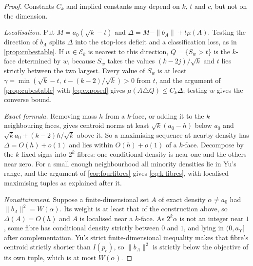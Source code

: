 \documentclass[11pt,a4paper]{article}
\numberwithin{equation}{section}
\theoremstyle{remark}
\begin{document}
\begin{proof}
Constants $C_k$ and implied constants may depend on $k$, $t$ and $c$, but
not on the dimension.

\emph{Localisation.} Put $M=a_0(\sqrt k-t)$ and
$\Delta=M-\|b_A\|+t\mu(A)$. Testing the direction of $b_A$ splits $\Delta$
into the stop-loss deficit and a classification loss, as in
\cref{prop:cubestable}. If $w\in\mathcal E_k$ is nearest to this direction,
$Q=\{S_w>t\}$ is the $k$-face determined by $w$, because $S_w$ takes the
values $(k-2j)/\sqrt k$ and $t$ lies strictly between the two largest. Every
value of $S_w$ is at least
$\gamma=\min(\sqrt k-t,\ t-(k-2)/\sqrt k)>0$ from $t$, and the argument of
\cref{prop:cubestable} with \eqref{eq:exposed} gives
$\mu(A\triangle Q)\le C_k\Delta$; testing $w$ gives the converse bound.

\emph{Exact formula.} Removing mass $h$ from a $k$-face, or adding it to
the $k$ neighbouring faces, gives centroid norms at least
$\sqrt k(a_0-h)$ below $a_0$ and $\sqrt ka_0+(k-2)h/\sqrt k$ above it. So a
maximising sequence at nearby density has $\Delta=O(h)+o(1)$ and lies within
$O(h)+o(1)$ of a $k$-face. Decompose by the $k$ fixed signs into $2^k$
fibres: one conditional density is near one and the others near zero. For
a small enough neighbourhood all minority densities lie in Yu's range, and
the argument of \cref{cor:fourfibres} gives \eqref{eq:k-fibres}, with
localised maximising tuples as explained after it.

\emph{Nonattainment.} Suppose a finite-dimensional set $A$ of exact density
$\alpha\ne a_0$ had $\|b_A\|^2=W(\alpha)$. Its weight is at least that of
the construction above, so $\Delta(A)=O(h)$ and $A$ is localised near a
$k$-face. As $2^k\alpha$ is not an integer near $1$, some fibre has
conditional density strictly between $0$ and $1$, and lying in $(0,a_{\mathrm Y}]$
after complementation. Yu's strict finite-dimensional inequality makes that
fibre's centroid strictly shorter than $I(p_e)$, so $\|b_A\|^2$ is strictly
below the objective of its own tuple, which is at most $W(\alpha)$.


\end{proof}
\end{document}
